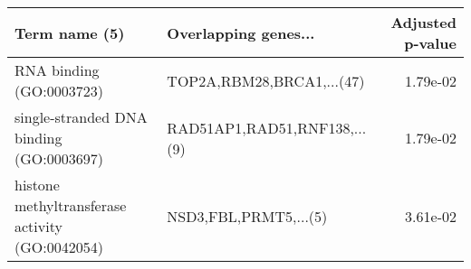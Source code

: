 \begin{tabular}{llr}
\toprule
                                  Term name (5) &         Overlapping genes... &  Adjusted p-value \\
\midrule
                       RNA binding (GO:0003723) &    TOP2A,RBM28,BRCA1,...(47) &          1.79e-02 \\
       single-stranded DNA binding (GO:0003697) & RAD51AP1,RAD51,RNF138,...(9) &          1.79e-02 \\
histone methyltransferase activity (GO:0042054) &        NSD3,FBL,PRMT5,...(5) &          3.61e-02 \\
\bottomrule
\end{tabular}
